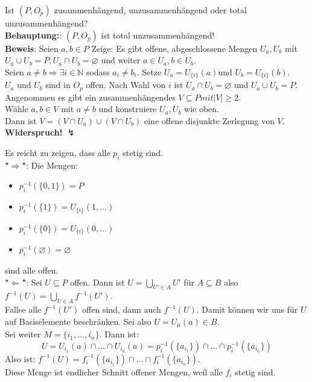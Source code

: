 \begin{problem*}[2b]
Ist $ (P, O_p)$  zusammenhängend, unzusammenhängend oder total unzusammenhängend?\\
\textbf{Behauptung:}: $ (P, O_p)$ ist total unzusammenhängend!\\
\textbf{Beweis}: Seien $ a,b \in P$ Zeige: Es gibt offene, abgeschlossene Mengen $ U_a, U_b$ mit $U_a \cup U_b = P, U_a \cap U_b = \varnothing$ und weiter $ a \in U_a , b \in U_b$.\\
Seien $a \neq b \Rightarrow \exists i \in \mathbb{N}$ sodass $a_i \neq b_i$. Setze $ U_a = U_{\{ i \}}(a)$und $ U_b = U_{\{ i \}}(b)$.\\
$ U_a $ und $ U_b $ sind in $ O_p $ offen. Nach Wahl von $i $ ist $ U_a \cap U_b = \varnothing$ und $ U_a \cup U_b = P$. Angenommen es gibt ein zusammenhängendes $V \subseteq P mit \vert V \vert \geq 2$.\\
Wähle $a, b \in V$ mit $ a \neq b$ und konstruiere $U_a, U_b$ wie oben.\\
Dann ist $ V = (V \cap U_a) \cup (V \cap U_b)$ eine offene disjunkte Zerlegung von $ V $.\\
\textbf{Widerspruch!} $\lightning$

\end{problem*}

\begin{problem*}[3a]
Es reicht zu zeigen, dass alle $p_i$ stetig sind.\\
\textbf{"$\Rightarrow$"}: Die Mengen:
\begin{itemize}
 	\item $ p_i^{-1}( \{ 0,1 \}) = P$
 	\item $p_i^{-1}(\{ 1 \}) = U_{\{ i \}}(1,\dots)$
 	\item $ p_i^{-1}(\{ 0 \}) = U_{\{ i \}}(0,\dots)$
	\item $p_i^{-1}(\varnothing) = \varnothing$
 \end{itemize}
sind alle offen.\\
\textbf{"$\Leftarrow$"}: Sei $ U \subseteq P$ offen. Dann ist $U = \bigcup_{ U' \in A }U'$ für $ A \subseteq B$ also $f^{-1}(U) = \bigcup_{U \in A} f^{-1}(U')$. \\
Fallse alle $f^{-1}(U')$ offen sind, dann auch $ f^{-1}(U) $. Damit können wir uns für $U$ auf Basiselemente beschränken. Sei also $ U = U_\mu(a) \in B$.\\
Sei weiter $M = \{ i_1, \dots,i_n \}$. Dann ist:
\begin{equation*}
    U = U_{i_1}(a)\cap \dots \cap U_{i_n}(a) = p_i^{-1}(\{ a_{i_1} \}) \cap \dots \cap p_i^{-1}(\{ a_{i_n} \})
\end{equation*}
Also ist: $f^{-1}(U) = f_i^{-1}(\{ a_{i_1} \}) \cap \dots \cap f_i^{-1}(\{ a_{i_n} \}) $.\\
Diese Menge ist endlicher Schnitt offener Mengen, weil alle $f_i$ stetig sind.
\end{problem*}

